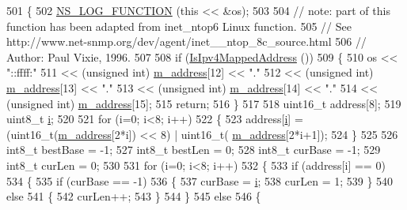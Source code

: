 \begin{DoxyCode}
501 \{
502   \hyperlink{log-macros-disabled_8h_a90b90d5bad1f39cb1b64923ea94c0761}{NS\_LOG\_FUNCTION} (\textcolor{keyword}{this} << &os);
503 
504   \textcolor{comment}{// note: part of this function has been adapted from inet\_ntop6 Linux function.}
505   \textcolor{comment}{// See http://www.net-snmp.org/dev/agent/inet\_\_ntop\_8c\_source.html}
506   \textcolor{comment}{// Author: Paul Vixie, 1996.}
507 
508   \textcolor{keywordflow}{if} (\hyperlink{classns3_1_1Ipv6Address_a2317c35991225feaaaa6fbd5d0711a65}{IsIpv4MappedAddress} ())
509     \{
510       os << \textcolor{stringliteral}{"::ffff:"}
511          << (\textcolor{keywordtype}{unsigned} int) \hyperlink{classns3_1_1Ipv6Address_abed5a405daedc6ed189f770f44cb04e5}{m\_address}[12] << \textcolor{stringliteral}{"."}
512          << (\textcolor{keywordtype}{unsigned} \textcolor{keywordtype}{int}) \hyperlink{classns3_1_1Ipv6Address_abed5a405daedc6ed189f770f44cb04e5}{m\_address}[13] << \textcolor{stringliteral}{"."}
513          << (\textcolor{keywordtype}{unsigned} int) \hyperlink{classns3_1_1Ipv6Address_abed5a405daedc6ed189f770f44cb04e5}{m\_address}[14] << \textcolor{stringliteral}{"."}
514          << (\textcolor{keywordtype}{unsigned} \textcolor{keywordtype}{int}) \hyperlink{classns3_1_1Ipv6Address_abed5a405daedc6ed189f770f44cb04e5}{m\_address}[15];
515       \textcolor{keywordflow}{return};
516     \}
517 
518   uint16\_t address[8];
519   uint8\_t \hyperlink{bernuolliDistribution_8m_a6f6ccfcf58b31cb6412107d9d5281426}{i};
520 
521   \textcolor{keywordflow}{for} (i=0; i<8; i++)
522     \{
523       address[\hyperlink{bernuolliDistribution_8m_a6f6ccfcf58b31cb6412107d9d5281426}{i}] = (uint16\_t(\hyperlink{classns3_1_1Ipv6Address_abed5a405daedc6ed189f770f44cb04e5}{m\_address}[2*i]) << 8) | uint16\_t(
      \hyperlink{classns3_1_1Ipv6Address_abed5a405daedc6ed189f770f44cb04e5}{m\_address}[2*i+1]);
524     \}
525 
526   int8\_t bestBase = -1;
527   int8\_t bestLen = 0;
528   int8\_t curBase = -1;
529   int8\_t curLen = 0;
530 
531   \textcolor{keywordflow}{for} (i=0; i<8; i++)
532     \{
533       \textcolor{keywordflow}{if} (address[i] == 0)
534         \{
535           \textcolor{keywordflow}{if} (curBase == -1)
536             \{
537               curBase = \hyperlink{bernuolliDistribution_8m_a6f6ccfcf58b31cb6412107d9d5281426}{i};
538               curLen = 1;
539             \}
540           \textcolor{keywordflow}{else}
541             \{
542               curLen++;
543             \}
544         \}
545       \textcolor{keywordflow}{else}
546         \{

\end{DoxyCode}

